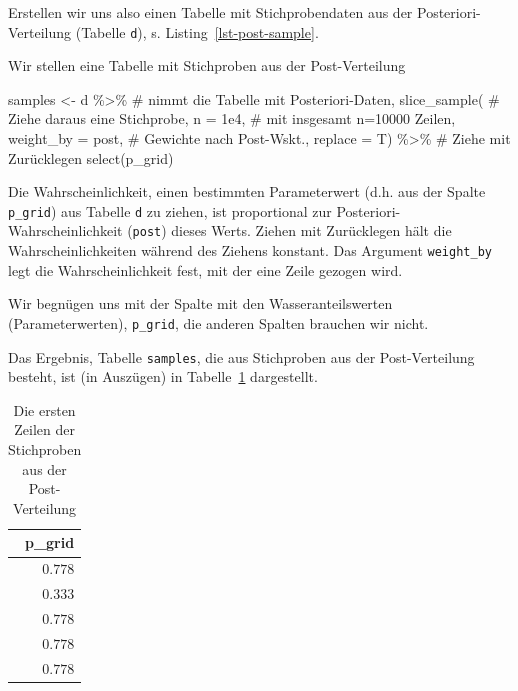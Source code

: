 \documentclass[
  a4paper,
  DIV=11]{scrreprt}
\newenvironment{Shaded}{\begin{snugshade}}{\end{snugshade}}
\newcommand{\AttributeTok}[1]{\textcolor[rgb]{0.40,0.45,0.13}{#1}}
\newcommand{\CommentTok}[1]{\textcolor[rgb]{0.37,0.37,0.37}{#1}}
\newcommand{\FloatTok}[1]{\textcolor[rgb]{0.68,0.00,0.00}{#1}}
\newcommand{\FunctionTok}[1]{\textcolor[rgb]{0.28,0.35,0.67}{#1}}
\newcommand{\NormalTok}[1]{\textcolor[rgb]{0.00,0.23,0.31}{#1}}
\newcommand{\OtherTok}[1]{\textcolor[rgb]{0.00,0.23,0.31}{#1}}
\newcommand{\SpecialCharTok}[1]{\textcolor[rgb]{0.37,0.37,0.37}{#1}}
\theoremstyle{definition}
\theoremstyle{remark}
\begin{document}
Erstellen wir uns also einen Tabelle mit Stichprobendaten aus der
Posteriori-Verteilung (Tabelle \texttt{d}), s.
Listing~\ref{lst-post-sample}.

\begin{codelisting}

\caption{Wir stellen eine Tabelle mit Stichproben aus der
Post-Verteilung}

\hypertarget{lst-post-sample}{%
\label{lst-post-sample}}%
\begin{Shaded}
\begin{Highlighting}[]
\NormalTok{samples }\OtherTok{\textless{}{-}}
\NormalTok{  d }\SpecialCharTok{\%\textgreater{}\%}  \CommentTok{\# nimmt die Tabelle mit Posteriori{-}Daten,}
  \FunctionTok{slice\_sample}\NormalTok{(  }\CommentTok{\# Ziehe daraus eine Stichprobe,}
    \AttributeTok{n =} \FloatTok{1e4}\NormalTok{,  }\CommentTok{\# mit insgesamt n=10000 Zeilen,}
    \AttributeTok{weight\_by =}\NormalTok{ post,  }\CommentTok{\# Gewichte nach Post{-}Wskt.,}
    \AttributeTok{replace =}\NormalTok{ T)  }\SpecialCharTok{\%\textgreater{}\%}  \CommentTok{\# Ziehe mit Zurücklegen}
  \FunctionTok{select}\NormalTok{(p\_grid)}
\end{Highlighting}
\end{Shaded}

\end{codelisting}

Die Wahrscheinlichkeit, einen bestimmten Parameterwert (d.h. aus der
Spalte \texttt{p\_grid}) aus Tabelle \texttt{d} zu ziehen, ist
proportional zur Posteriori-Wahrscheinlichkeit (\texttt{post}) dieses
Werts. Ziehen mit Zurücklegen hält die Wahrscheinlichkeiten während des
Ziehens konstant. Das Argument \texttt{weight\_by} legt die
Wahrscheinlichkeit fest, mit der eine Zeile gezogen wird.

Wir begnügen uns mit der Spalte mit den Wasseranteilswerten
(Parameterwerten), \texttt{p\_grid}, die anderen Spalten brauchen wir
nicht.

Das Ergebnis, Tabelle \texttt{samples}, die aus Stichproben aus der
Post-Verteilung besteht, ist (in Auszügen) in
Tabelle~\ref{tbl-postsample1} dargestellt.

\hypertarget{tbl-postsample1}{}
\begin{longtable}{r}
\caption{\label{tbl-postsample1}Die ersten Zeilen der Stichproben aus der Post-Verteilung }\tabularnewline

\toprule
p\_grid \\ 
\midrule
$0.778$ \\ 
$0.333$ \\ 
$0.778$ \\ 
$0.778$ \\ 
$0.778$ \\ 
\bottomrule
\end{longtable}
\end{document}
